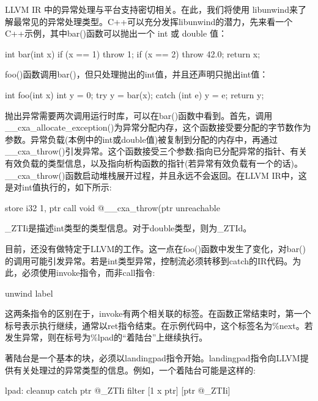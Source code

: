 LLVM IR 中的异常处理与平台支持密切相关。在此，我们将使用 libunwind来了解最常见的异常处理类型。C++可以充分发挥libunwind的潜力，先来看一个C++示例，其中bar()函数可以抛出一个 int 或 double 值：

\begin{cpp}
int bar(int x) {
    if (x == 1) throw 1;
    if (x == 2) throw 42.0;
    return x;
}
\end{cpp}

foo()函数调用bar()，但只处理抛出的int值，并且还声明只抛出int值：

\begin{cpp}
int foo(int x) {
    int y = 0;
    try {
        y = bar(x);
    }
    catch (int e) {
        y = e;
    }
    return y;
}
\end{cpp}

抛出异常需要两次调用运行时库，可以在bar()函数中看到。首先，调用\_\_cxa\_allocate\_exception()为异常分配内存，这个函数接受要分配的字节数作为参数。异常负载(本例中的int或double值)被复制到分配的内存中，再通过\_\_cxa\_throw()引发异常。这个函数接受三个参数:指向已分配异常的指针、有关有效负载的类型信息，以及指向析构函数的指针(若异常有效负载有一个的话)。\_\_cxa\_throw()函数启动堆栈展开过程，并且永远不会返回。在LLVM IR中，这是对int值执行的，如下所示:

\begin{shell}
store i32 1, ptr %
call void @__cxa_throw(ptr %
unreachable
\end{shell}

\_ZTIi是描述int类型的类型信息。对于double类型，则为\_ZTId。

目前，还没有做特定于LLVM的工作。这一点在foo()函数中发生了变化，对bar()的调用可能引发异常。若是int类型异常，控制流必须转移到catch的IR代码。为此，必须使用invoke指令，而非call指令:

\begin{shell}
                                 unwind label %
\end{shell}

这两条指令的区别在于，invoke有两个相关联的标签。在函数正常结束时，第一个标号表示执行继续，通常以ret指令结束。在示例代码中，这个标签名为\%next。若发生异常，则在标号为\%lpad的“着陆台”上继续执行。

著陆台是一个基本的块，必须以landingpad指令开始。landingpad指令向LLVM提供有关处理过的异常类型的信息。例如，一个着陆台可能是这样的:

\begin{shell}
lpad:
            cleanup
            catch ptr @_ZTIi
            filter [1 x ptr] [ptr @_ZTIi]
\end{shell}

